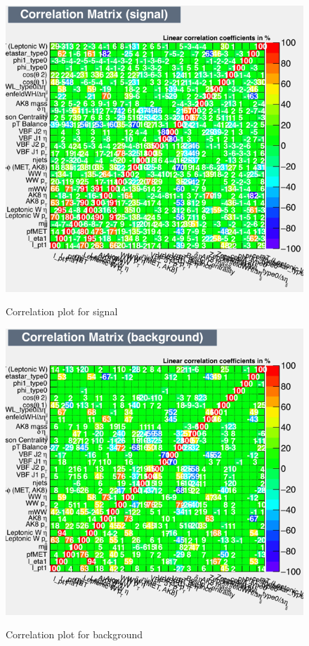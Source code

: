 \begin{figure}[h!]
	 \centering
	 {\includegraphics[width=1.2\textwidth, angle =90]{Plots/BDT_Performance/Trial1/dataset/plots/CorrelationMatrixS.png}}
	 \caption{Correlation plot for signal}
\end{figure}
\begin{figure}[h!]\ContinuedFloat
	 {\includegraphics[width=1.2\textwidth, angle =90]{Plots/BDT_Performance/Trial1/dataset/plots/CorrelationMatrixB.png}}
	 \caption{Correlation plot for background}
\end{figure}
%
%
%
\clearpage
